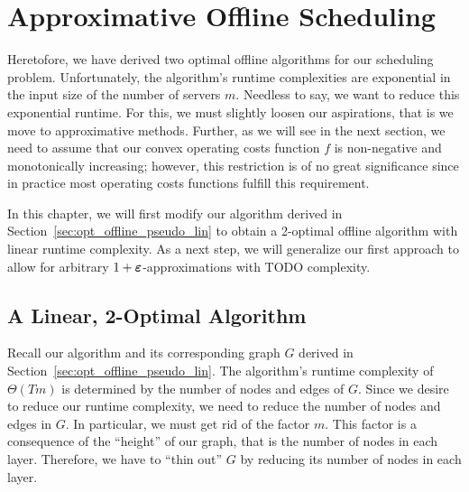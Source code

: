 
\chapter{Approximative Offline Scheduling}\label{chap:approx_offline_scheduling}
Heretofore, we have derived two optimal offline algorithms for our scheduling problem. Unfortunately, the algorithm's runtime complexities are exponential in the input size of the number of servers $m$. Needless to say, we want to reduce this exponential runtime. For this, we must slightly loosen our aspirations, that is we move to approximative methods. Further, as we will see in the next section, we need to assume that our convex operating costs function $f$ is non-negative and monotonically increasing; however, this restriction is of no great significance since in practice most operating costs functions fulfill this requirement. 

In this chapter, we will first modify our algorithm derived in Section~\ref{sec:opt_offline_pseudo_lin} to obtain a 2-optimal offline algorithm with linear runtime complexity. As a next step, we will generalize our first approach to allow for arbitrary $1+\boldsymbol\varepsilon$-approximations with TODO complexity.

\section{A Linear, 2-Optimal Algorithm}
Recall our algorithm and its corresponding graph $G$ derived in Section~\ref{sec:opt_offline_pseudo_lin}. The algorithm's runtime complexity of $\Theta(Tm)$ is determined by the number of nodes and edges of $G$. Since we desire to reduce our runtime complexity, we need to reduce the number of nodes and edges in $G$. In particular, we must get rid of the factor $m$. This factor is a consequence of the ``height'' of our graph, that is the number of nodes in each layer. Therefore, we have to ``thin out'' $G$ by reducing its number of nodes in each layer.

